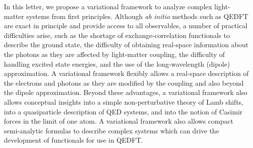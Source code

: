 \documentclass[aps,prl,twocolumn,
	groupedaddress,superscriptaddress,
	amsfonts,amssymb,amsmath,floatfix,
	citeautoscript]{revtex4-1}
\begin{document}
In this letter, we propose a variational framework to analyze complex light-matter systems from first principles. Although  \textit{ab initio} methods such as QEDFT are exact in principle and provide access to all observables, a number of practical difficulties arise, such as the shortage of exchange-correlation functionals to describe the ground state, the difficulty of obtaining real-space information about the photons as they are affected by light-matter coupling, the difficulty of handling excited state energies, and the use of the long-wavelength (dipole) approximation. A variational framework flexibly allows a real-space description of the electrons and photons as they are modified by the coupling and also beyond the dipole approximation. Beyond these advantages, a variational framework also allows conceptual insights into a simple non-perturbative theory of Lamb shifts, into a quasiparticle description of QED systems, and into the notion of Casimir forces in the limit of one atom. A variational framework also allows compact semi-analytic formulas to describe complex systems which can drive the development of functionals for use in QEDFT.
\end{document}
